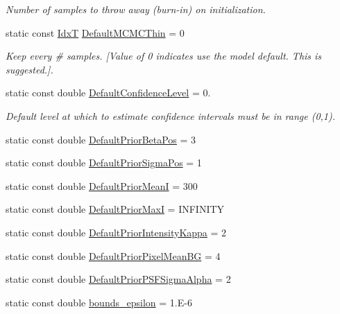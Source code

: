 \begin{DoxyCompactItemize}
\begin{DoxyCompactList}\small\item\em Number of samples to throw away (burn-\/in) on initialization. \end{DoxyCompactList}\item 
static const \hyperlink{namespacemappel_ab17ec0f30b61ece292439d7ece81d3a8}{IdxT} \hyperlink{classmappel_1_1PointEmitterModel_aac243ab7c6862c3d9ce3af8ca8a17e6c}{Default\+M\+C\+M\+C\+Thin} = 0
\begin{DoxyCompactList}\small\item\em Keep every \# samples. \mbox{[}Value of 0 indicates use the model default. This is suggested.\mbox{]}. \end{DoxyCompactList}\item 
static const double \hyperlink{classmappel_1_1PointEmitterModel_ac57f7550589dcdbf3b6281e91d3e24ff}{Default\+Confidence\+Level} = 0.
\begin{DoxyCompactList}\small\item\em Default level at which to estimate confidence intervals must be in range (0,1). \end{DoxyCompactList}\item 
static const double \hyperlink{classmappel_1_1PointEmitterModel_a2771dc4415f351862619cd9671b5310d}{Default\+Prior\+Beta\+Pos} = 3
\item 
static const double \hyperlink{classmappel_1_1PointEmitterModel_a38b73a91eaae7b5fd0977b88ea844280}{Default\+Prior\+Sigma\+Pos} = 1
\item 
static const double \hyperlink{classmappel_1_1PointEmitterModel_a607fcdea787b0cc3c6ac8804d378d1b1}{Default\+Prior\+MeanI} = 300
\item 
static const double \hyperlink{classmappel_1_1PointEmitterModel_a4ad3422744bdac162e905d5615bf5b66}{Default\+Prior\+MaxI} = I\+N\+F\+I\+N\+I\+TY
\item 
static const double \hyperlink{classmappel_1_1PointEmitterModel_a03d9f90c130df2d42d0d31c9337e914c}{Default\+Prior\+Intensity\+Kappa} = 2
\item 
static const double \hyperlink{classmappel_1_1PointEmitterModel_a72efb3ee01fa548683d510288266fea5}{Default\+Prior\+Pixel\+Mean\+BG} = 4
\item 
static const double \hyperlink{classmappel_1_1PointEmitterModel_a2b06111eaa1ff284851c2e67a3827220}{Default\+Prior\+P\+S\+F\+Sigma\+Alpha} = 2
\item 
static const double \hyperlink{classmappel_1_1PointEmitterModel_ac987a119137b85a27704b1c40e3fab8c}{bounds\+\_\+epsilon} = 1.\+E-\/6

\end{DoxyCompactItemize}
